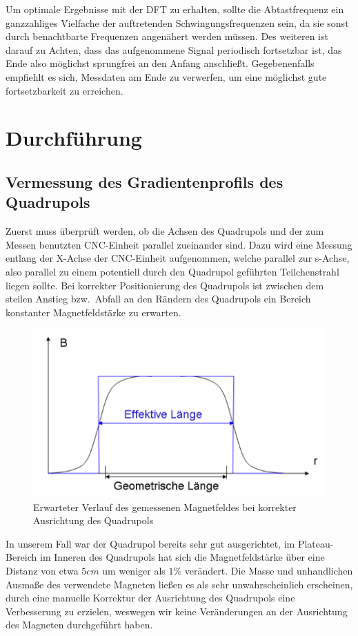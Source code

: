 \documentclass[bigchapter,colorback,accentcolor=tud4b,linedtoc,11pt]{tudreport}
\begin{document}
Um optimale Ergebnisse mit der DFT zu erhalten, sollte die Abtastfrequenz ein ganzzahliges Vielfache der auftretenden Schwingungsfrequenzen sein, da sie sonst durch benachtbarte Frequenzen angenähert werden müssen. Des weiteren ist darauf zu Achten, dass das aufgenommene Signal periodisch fortsetzbar ist, das Ende also möglichst sprungfrei an den Anfang anschließt. Gegebenenfalls empfiehlt es sich, Messdaten am Ende zu verwerfen, um eine möglichst gute fortsetzbarkeit zu erreichen.
\chapter{Durchführung}
\section{Vermessung des Gradientenprofils des Quadrupols}

Zuerst muss überprüft werden, ob die Achsen des Quadrupols und der zum Messen benutzten CNC-Einheit parallel zueinander sind. Dazu wird eine Messung entlang der X-Achse der CNC-Einheit aufgenommen, welche parallel zur s-Achse, also parallel zu einem potentiell durch den Quadrupol geführten Teilchenstrahl liegen sollte. Bei korrekter Positionierung des Quadrupols ist zwischen dem steilen Anstieg bzw.\ Abfall an den Rändern des Quadrupols ein Bereich konstanter Magnetfeldstärke zu erwarten.
\begin{figure}[H]
\centering
\includegraphics[width=130mm]{img/magnetfeldplateau.png}
\caption{Erwarteter Verlauf des gemessenen Magnetfeldes bei korrekter Ausrichtung des Quadrupols \cite{anleitung}}
\end{figure}
In unserem Fall war der Quadrupol bereits sehr gut ausgerichtet, im Plateau-Bereich im Inneren des Quadrupols hat sich die Magnetfeldstärke über eine Distanz von etwa $5 cm$ um weniger als $1\%$ verändert. Die Masse und unhandlichen Ausmaße des verwendete Magneten ließen es als sehr unwahrscheinlich erscheinen, durch eine manuelle Korrektur der Ausrichtung des Quadrupols eine Verbesserung zu erzielen, weswegen wir keine Veränderungen an der Ausrichtung des Magneten durchgeführt haben.
\end{document}
